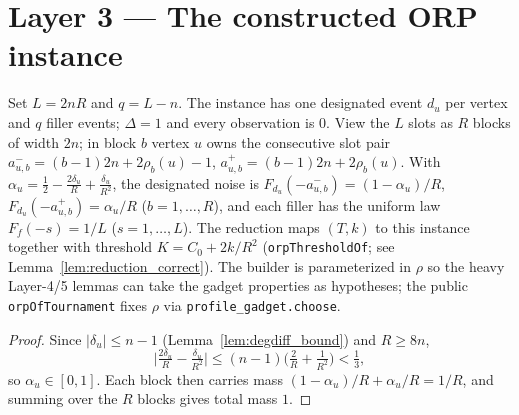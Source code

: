 \section{Layer 3 --- The constructed ORP instance}

\begin{definition}
\label{def:orp_of_tournament}
\leanok
{}
Set $L = 2nR$ and $q = L - n$. The instance has one designated event $d_u$ per
vertex and $q$ filler events; $\Delta = 1$ and every observation is $0$. View the
$L$ slots as $R$ blocks of width $2n$; in block $b$ vertex $u$ owns the
consecutive slot pair $a^-_{u,b} = (b-1)2n + 2\rho_b(u) - 1$,
$a^+_{u,b} = (b-1)2n + 2\rho_b(u)$. With
$\alpha_u = \tfrac12 - \tfrac{2\delta_u}{R} + \tfrac{\delta_u}{R^2}$, the
designated noise is $F_{d_u}(-a^-_{u,b}) = (1-\alpha_u)/R$,
$F_{d_u}(-a^+_{u,b}) = \alpha_u/R$ ($b = 1,\dots,R$), and each filler has the
uniform law $F_f(-s) = 1/L$ ($s = 1,\dots,L$). The reduction maps $(T,k)$ to this
instance together with threshold $K = C_0 + 2k/R^2$ (\texttt{orpThresholdOf};
see Lemma~\ref{lem:reduction_correct}). The builder is parameterized in $\rho$ so
the heavy Layer-4/5 lemmas can take the gadget properties as hypotheses; the
public \texttt{orpOfTournament} fixes $\rho$ via \texttt{profile\_gadget.choose}.
\end{definition}

\begin{proof}
\leanok
{}
Since $|\delta_u| \le n-1$ (Lemma~\ref{lem:degdiff_bound}) and $R \ge 8n$,
\[
  \Big|\tfrac{2\delta_u}{R} - \tfrac{\delta_u}{R^2}\Big|
  \le (n-1)\Big(\tfrac2R + \tfrac1{R^2}\Big) < \tfrac13,
\]
so $\alpha_u \in [0,1]$. Each block then carries mass
$(1-\alpha_u)/R + \alpha_u/R = 1/R$, and summing over the $R$ blocks gives total
mass $1$.
\end{proof}

